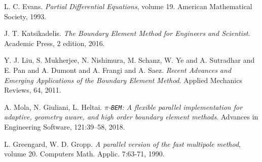 \documentclass[numbers]{ifacconf}
\begin{document}
\begin{enumerate}[label={[\arabic*]}]
\item L. C. Evans. \emph{Partial Differential Equations}, volume 19. American Mathematical Society, 1993. \label{Evans}
\item J. T. Katsikadelis. \emph{The Boundary Element Method for Engineers and Scientist}. Academic Press, 2 edition, 2016. \label{Katsi}
\item Y. J. Liu, S. Mukherjee, N. Nishimura, M. Schanz, W. Ye and A. Sutradhar and E. Pan and A. Dumont and A. Frangi and A. Saez. \emph{Recent Advances and Emerging Applications of the Boundary Element Method}. Applied Mechanics Reviews, 64, 2011. \label{Attilio}
\item A. Mola, N. Giuliani, L. Heltai. \emph{$\pi$-\texttt{BEM}: A flexible parallel implementation for adaptive, geometry aware, and high order boundary element methods}. Advances in Engineering Software, 121:39–58, 2018. \label{Mola}
\item L. Greengard, W. D. Gropp. \emph{A parallel version of the fast multipole method}, volume 20. Computers Math. Applic. 7:63-71, 1990. \label{grop}
\end{enumerate}





%


\end{document}
